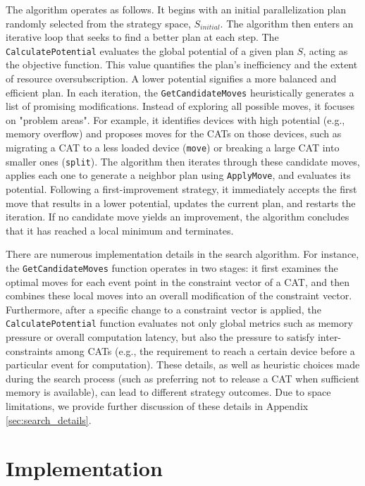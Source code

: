 \documentclass[letterpaper,twocolumn,10pt]{article}
\begin{document}
The algorithm operates as follows. It begins with an initial parallelization plan randomly selected from the strategy space, $S_{initial}$. The algorithm then enters an iterative loop that seeks to find a better plan at each step. The \texttt{CalculatePotential} evaluates the global potential of a given plan $S$, acting as the objective function. This value quantifies the plan's inefficiency and the extent of resource oversubscription. A lower potential signifies a more balanced and efficient plan. In each iteration, the \texttt{GetCandidateMoves} heuristically generates a list of promising modifications. Instead of exploring all possible moves, it focuses on "problem areas". For example, it identifies devices with high potential (e.g., memory overflow) and proposes moves for the CATs on those devices, such as migrating a CAT to a less loaded device (\texttt{move}) or breaking a large CAT into smaller ones (\texttt{split}). The algorithm then iterates through these candidate moves, applies each one to generate a neighbor plan using \texttt{ApplyMove}, and evaluates its potential. Following a first-improvement strategy, it immediately accepts the first move that results in a lower potential, updates the current plan, and restarts the iteration. If no candidate move yields an improvement, the algorithm concludes that it has reached a local minimum and terminates.

There are numerous implementation details in the search algorithm. For instance, the \texttt{GetCandidateMoves} function operates in two stages: it first examines the optimal moves for each event point in the constraint vector of a CAT, and then combines these local moves into an overall modification of the constraint vector. Furthermore, after a specific change to a constraint vector is applied, the \texttt{CalculatePotential} function evaluates not only global metrics such as memory pressure or overall computation latency, but also the pressure to satisfy inter-constraints among CATs (e.g., the requirement to reach a certain device before a particular event for computation). These details, as well as heuristic choices made during the search process (such as preferring not to release a CAT when sufficient memory is available), can lead to different strategy outcomes. Due to space limitations, we provide further discussion of these details in Appendix \ref{sec:search_details}.


\section{Implementation}
\label{sec:implementation}
\end{document}

